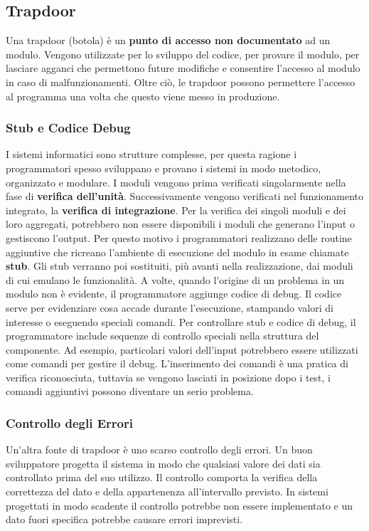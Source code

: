\subsection{Trapdoor}
Una trapdoor (botola) è un \textbf{punto di accesso non documentato} ad un modulo. Vengono utilizzate per lo sviluppo del codice, per provare il modulo, per lasciare agganci che permettono future modifiche e consentire l'accesso al modulo in caso di malfunzionamenti. Oltre ciò, le trapdoor possono permettere l'accesso al programma una volta che questo viene messo in produzione.
\subsubsection{Stub e Codice Debug}
I sistemi informatici sono strutture complesse, per questa ragione i programmatori spesso sviluppano e provano i sistemi in modo metodico, organizzato e modulare. I moduli vengono prima verificati singolarmente nella fase di \textbf{verifica dell'unità}. Successivamente vengono verificati nel funzionamento integrato, la \textbf{verifica di integrazione}.
Per la verifica dei singoli moduli e dei loro aggregati, potrebbero non essere disponibili i moduli che generano l'input o gestiscono l'output. Per questo motivo i programmatori realizzano delle routine aggiuntive che ricreano l'ambiente di esecuzione del modulo in esame chiamate \textbf{stub}. Gli stub verranno poi sostituiti, più avanti nella realizzazione, dai moduli di cui emulano le funzionalità. A volte, quando l'origine di un problema in un modulo non è evidente, il programmatore aggiunge codice di debug. Il codice serve per evidenziare cosa accade durante l'esecuzione, stampando valori di interesse o eseguendo speciali comandi.
\newline
Per controllare stub e codice di debug, il programmatore include sequenze di controllo speciali nella struttura del componente. Ad esempio, particolari valori dell'input potrebbero essere utilizzati come comandi per gestire il debug. L'inserimento dei comandi è una pratica di verifica riconosciuta, tuttavia se vengono lasciati in posizione dopo i test, i comandi aggiuntivi possono diventare un serio problema.
\subsubsection{Controllo degli Errori}
Un'altra fonte di trapdoor è uno scarso controllo degli errori. Un buon sviluppatore progetta il sistema in modo che qualsiasi valore dei dati sia controllato prima del suo utilizzo. Il controllo comporta la verifica della correttezza del dato e della appartenenza all'intervallo previsto.
In sistemi progettati in modo scadente il controllo potrebbe non essere implementato e un dato fuori specifica potrebbe causare errori imprevisti.
